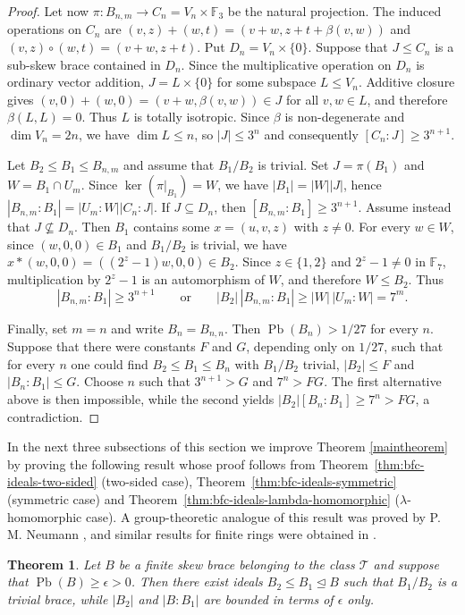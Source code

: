 \documentclass[11pt, oneside]{amsart}
\numberwithin{equation}{section}
\theoremstyle{plain}
\newtheorem{thm}[equation]{Theorem}
\theoremstyle{definition}
\newcommand{\Pb}{\operatorname{Pb} }
\begin{document}
\begin{proof}
Let now $\pi:B_{n,m}\to C_n=V_n\times\mathbb F_3$ be the natural projection. The induced operations on $C_n$ are
$(v,z)+(w,t)=(v+w,z+t+\beta(v,w))$ and
$(v,z)\circ(w,t)=(v+w,z+t)$. Put $D_n=V_n\times\{0\}$. Suppose that $J\leqslant C_n$ is a sub-skew brace contained in $D_n$. Since the multiplicative operation on $D_n$ is ordinary vector addition, $J=L\times\{0\}$ for some subspace $L\leqslant V_n$. Additive closure gives
$(v,0)+(w,0)=(v+w,\beta(v,w))\in J$ for all $v,w\in L$, and therefore $\beta(L,L)=0$. Thus $L$ is totally isotropic. Since $\beta$ is non-degenerate and $\dim V_n=2n$, we have $\dim L\leqslant n$, so $|J|\leqslant3^n$ and consequently $[C_n:J]\geqslant3^{n+1}$.

Let $B_2\leqslant B_1\leqslant B_{n,m}$ and assume that $B_1/B_2$ is trivial. Set $J=\pi(B_1)$ and $W=B_1\cap U_m$. Since $\ker(\pi|_{B_1})=W$, we have $|B_1|=|W||J|$, hence
$|B_{n,m}:B_1|=|U_m:W||C_n:J|$. If $J\subseteq D_n$, then $[B_{n,m}:B_1]\geqslant3^{n+1}$. Assume instead that $J\not\subseteq D_n$. Then $B_1$ contains some $x=(u,v,z)$ with $z\neq0$. For every $w\in W$, since $(w,0,0)\in B_1$ and $B_1/B_2$ is trivial, we have
$x*(w,0,0)=((2^z-1)w,0,0)\in B_2$. Since $z\in\{1,2\}$ and $2^z-1\neq0$ in $\mathbb F_7$, multiplication by $2^z-1$ is an automorphism of $W$, and therefore $W\leqslant B_2$. Thus
$$
|B_{n,m}:B_1|\geqslant3^{n+1}
\qquad\text{or}\qquad
|B_2|\,|B_{n,m}:B_1|
\geqslant |W|\,|U_m:W|
=7^m.
$$

Finally, set $m=n$ and write $B_n=B_{n,n}$. Then $\Pb(B_n)>1/27$ for every $n$. Suppose that there were constants $F$ and $G$, depending only on $1/27$, such that for every $n$ one could find $B_2\leqslant B_1\leqslant B_n$ with $B_1/B_2$ trivial, $|B_2|\leqslant F$ and $|B_n:B_1|\leqslant G$. Choose $n$ such that $3^{n+1}>G$ and $7^n>FG$. The first alternative above is then impossible, while the second yields
$|B_2|[B_n:B_1]\geqslant7^n>FG$, a contradiction.
\end{proof}


In the next three subsections of this section we improve Theorem \ref{maintheorem} by proving the following result whose proof follows from   Theorem~\ref{thm:bfc-ideals-two-sided} (two-sided case),  Theorem~\ref{thm:bfc-ideals-symmetric} (symmetric case) and  Theorem~\ref{thm:bfc-ideals-lambda-homomorphic} ($\lambda$-homomorphic case). A group-theoretic analogue of this result was proved by P. M. Neumann \cite{PMN89}, and similar results for finite rings were obtained in  \cite{SV24}. 

\begin{thm}\label{thm:bfc-ideals-class-T}
Let $B$ be a finite skew brace belonging to the class $\mathcal T$ and suppose that $\Pb(B)\geqslant\epsilon>0$. Then there exist ideals $B_2 \leqslant B_1\trianglelefteq B$ such that $B_1/B_2$ is a trivial brace, while $|B_2|$ and $|B:B_1|$ are bounded in terms of $\epsilon$ only.
\end{thm}
\end{document}
